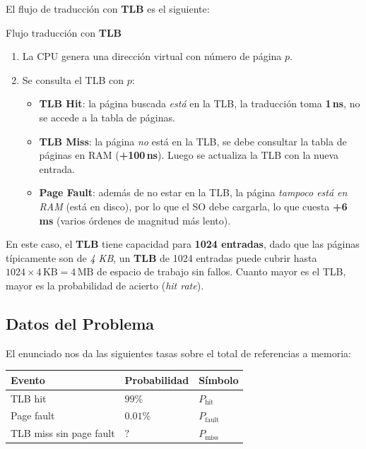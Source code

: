 \documentclass[12pt,letterpaper]{article}
\begin{document}
\medskip
\noindent
El flujo de traducción con \textbf{TLB} es el siguiente:

\begin{conceptbox}{Flujo traducción con \textbf{TLB}}
  \begin{enumerate}
  \item La CPU genera una dirección virtual con número de página $p$.
  \item Se consulta el TLB con $p$:
    \begin{itemize}
    \item \textbf{TLB Hit}: la página buscada \emph{está} en la TLB, la traducción toma \textbf{1\,ns}, no se accede a la tabla de páginas.
    \item \textbf{TLB Miss}: la página \emph{no} está en la TLB, se debe consultar la tabla de páginas en RAM (\textbf{+100\,ns}). Luego se actualiza la TLB con la nueva entrada.
    \item \textbf{Page Fault}: además de no estar en la TLB, la página \emph{tampoco está en RAM} (está en disco), por lo que el SO debe cargarla, lo que cuesta \textbf{+6\,ms} (varios órdenes de magnitud más lento).
    \end{itemize}
  \end{enumerate}
\end{conceptbox}

En este caso, el \textbf{TLB} tiene capacidad para \textbf{1024 entradas}, dado que las páginas típicamente son de \textit{4 KB}, un \textbf{TLB} de 1024 entradas puede cubrir hasta $1024 \times 4\,\text{KB} = 4\,\text{MB}$ de espacio de trabajo sin fallos. Cuanto mayor es el TLB, mayor es la probabilidad de acierto (\emph{hit rate}).

\subsection*{Datos del Problema}

\noindent
El enunciado nos da las siguientes tasas sobre el total de referencias a memoria:

\begin{center}
  \begin{tabular}{lll}
    \textbf{Evento} & \textbf{Probabilidad} & \textbf{Símbolo} \\
    \hline
    TLB hit & $99\%$ & $P_{\text{hit}}$   \\
    Page fault & $0.01\%$ & $P_{\text{fault}}$ \\
    TLB miss sin page fault & $?$ & $P_{\text{miss}}$  \\
  \end{tabular}
\end{center}
\end{document}
